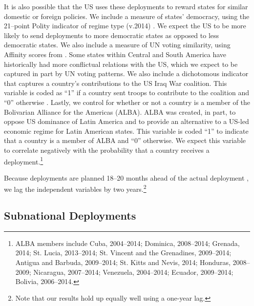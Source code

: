 \documentclass[12pt]{article}
\begin{document}
\begin{doublespace}
It is also possible that the US uses these deployments to reward states for similar domestic or foreign policies. We include a measure of states' democracy, using the 21--point Polity indicator of regime type (v.2014) \cite{MarshallJaggersGurr2011}. We expect the US to be more likely to send deployments to more democratic states as opposed to less democratic states. We also include a measure of UN voting similarity, using Affinity scores from . Some states within Central and South America have historically had more conflictual relations with the US, which we expect to be captured in part by UN voting patterns.  We also include a dichotomous indicator that captures a country's contributions to the US Iraq War coalition. This variable is coded as ``1'' if a country sent troops to contribute to the coalition and ``0'' otherwise \cite{Carney2011}. Lastly, we control for whether or not a country is a member of the Bolivarian Alliance for the Americas (ALBA). ALBA was created, in part, to oppose US dominance of Latin America and to provide an alternative to a US-led economic regime for Latin American states. This variable is coded ``1'' to indicate that a country is a member of ALBA and ``0'' otherwise. We expect this variable to correlate negatively with the probability that a country receives a deployment.\footnote{ALBA members include Cuba, 2004--2014; Dominica, 2008--2014; Grenada, 2014; St. Lucia, 2013--2014; St. Vincent and the Grenadines, 2009--2014; Antigua and Barbuda, 2009--2014; St. Kitts and Nevis, 2014; Honduras, 2008--2009; Nicaragua, 2007--2014; Venezuela, 2004--2014; Ecuador, 2009--2014; Bolivia, 2006--2014.}

Because deployments are planned 18--20 months ahead of the actual deployment \cite{CPT20160309}, we lag the independent variables by two years.\footnote{Note that our results hold up equally well using a one-year lag.}


\subsection{Subnational Deployments}


\end{doublespace}
\end{document}
